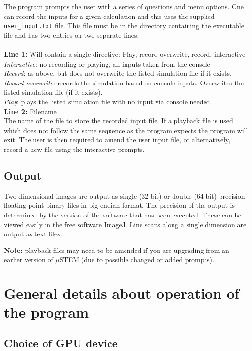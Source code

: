 \documentclass[12pt,a4paper]{article}
\begin{document}
The program prompts the user with a series of questions and menu options.
One can record the inputs for a given calculation and this uses the supplied \verb|user_input.txt| file.
This file must be in the directory containing the executable file and has two entries on two separate lines: \\ \\
{\bf Line 1:} Will contain a single directive: Play, record overwrite, record, interactive \\
\emph {Interactive}: no recording or playing, all inputs taken from the console \\
\emph {Record}: as above, but does not overwrite the listed simulation file if it exists. \\
\emph {Record overwrite}: records the simulation based on console inputs. Overwrites the listed simulation file (if it exists). \\
\emph {Play}: plays the listed simulation file with no input via console needed. \\
{\bf Line 2:} Filename \\
The name of the file to store the recorded input file.
If a playback file is used which does not  follow the same sequence as the program expects the program will exit. 
The user is then required to amend the user input file, or alternatively, record a new file using the interactive prompts.
%
\subsection{Output}\label{output}
Two dimensional images are output as single (32-bit) or double (64-bit) precision floating-point binary files in big-endian format.
The precision of the output is determined by the version of the software that has been executed. These can be viewed easily in the free software \href{http://imagej.nih.gov/ij/}{ImageJ}.
Line scans along a single dimension are output as text files.

{\bf Note:} playback files may need to be amended if you are upgrading from an earlier version of $\mu$STEM (due to possible changed or added prompts).



\section{General details about operation of the program}

\subsection{Choice of GPU device}
\end{document}
